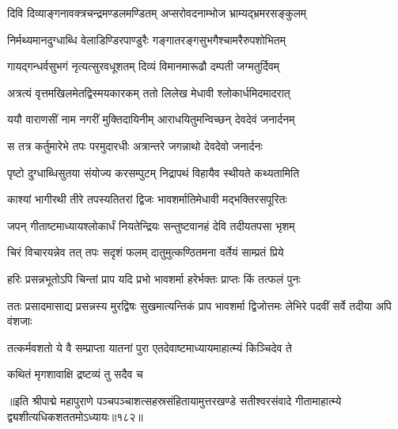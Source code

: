 \twolineshloka
{दिवि दिव्याङ्गनावक्त्रचन्द्रमण्डलमण्डितम्}
{अप्सरोवदनाम्भोज भ्राम्यद्भ्रमरसङ्कुलम्} %

\twolineshloka
{निर्मथ्यमानदुग्धाब्धि वेलाडिण्डिरपाण्डुरैः}
{गङ्गातरङ्गसुभगैश्चामरैरुपशोभितम्} %

\twolineshloka
{गायद्गन्धर्वसुभगं नृत्यत्सुरवधूशतम्}
{दिव्यं विमानमारूढौ दम्पती जग्मतुर्दिवम्} %

\twolineshloka
{अत्रत्यं वृत्तमखिलमेतद्विस्मयकारकम्}
{ततो लिलेख मेधावी श्लोकार्धमिदमादरात्} %

\twolineshloka
{ययौ वाराणसीं नाम नगरीं मुक्तिदायिनीम्}
{आराधयितुमन्विच्छन् देवदेवं जनार्दनम्} %

\twolineshloka
{स तत्र कर्तुमारेभे तपः परमुदारधीः}
{अत्रान्तरे जगन्नाथो देवदेवो जनार्दनः} %

\twolineshloka
{पृष्टो दुग्धाब्धिसुतया संयोज्य करसम्पुटम्}
{निद्रापथं विहायैव स्थीयते कथ्यतामिति} %


\twolineshloka
{काश्यां भागीरथी तीरे तपस्यतितरां द्विजः}
{भावशर्मातिमेधावी मद्भक्तिरसपूरितः} %

\twolineshloka
{जपन् गीताष्टमाध्यायश्लोकार्धं नियतेन्द्रियः}
{सन्तुष्टवानहं देवि तदीयतपसा भृशम्} %

\twolineshloka
{चिरं विचारयन्नेव तत् तपः सदृशं फलम्}
{दातुमुत्कण्ठितमना वर्तेयं साम्प्रतं प्रिये} %


\twolineshloka
{हरिः प्रसन्नभूतोऽपि चिन्तां प्राप यदि प्रभो}
{भावशर्मा हरेर्भक्तः प्राप्तः किं तत्फलं पुनः} %


\threelineshloka
{ततः प्रसादमासाद्य प्रसन्नस्य मुरद्विषः}
{सुखमात्यन्तिकं प्राप भावशर्मा द्विजोत्तमः}
{लेभिरे पदवीं सर्वे तदीया अपि वंशजाः} %

\twolineshloka
{तत्कर्मवशतो ये वै सम्प्राप्ता यातनां पुरा}
{एतदेवाष्टमाध्यायमाहात्म्यं किञ्चिदेव ते} %

\onelineshloka
{कथितं मृगशावाक्षि द्रष्टव्यं तु सदैव च} %

॥इति श्रीपाद्मे महापुराणे पञ्चपञ्चाशत्सहस्रसंहितायामुत्तरखण्डे सतीश्वरसंवादे गीतामाहात्म्ये द्व्यशीत्यधिकशततमोऽध्यायः॥१८२॥

\genMangalaShloka

\closesub

\ganapatyadiDhyanam
\padmaPuranam


